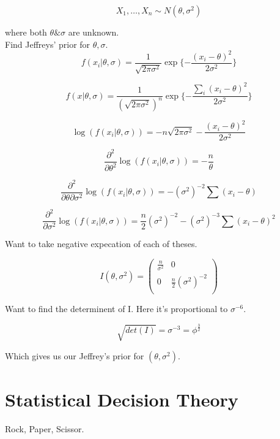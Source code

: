 \documentclass[11pt,fleqn]{book} %
\begin{document}
\begin{example}
	$$X_1, \dots, X_n \sim N(\theta, \sigma^2)$$

	where both $\theta \& \sigma$ are unknown. \\

	Find Jeffreys' prior for $\theta, \sigma$. \\

			$$f(x_i|\theta, \sigma) = \frac{1}{\sqrt{2 \pi \sigma^2}} \exp\{-\frac{(x_i - \theta)^2}{2 \sigma^2} \} $$

			$$f(x|\theta, \sigma) = \frac{1}{(\sqrt{2 \pi \sigma^2})^n} \exp\{-\frac{\sum_i(x_i - \theta)^2}{2 \sigma^2} \} $$

			$$\log(f(x_i|\theta, \sigma) )= -n \sqrt{2 \pi \sigma^2} -\frac{(x_i - \theta)^2}{2 \sigma^2}  $$

			$$\frac{\partial^2}{\partial \theta^2}\log(f(x_i|\theta, \sigma) )= -\frac{n}{\theta} $$

			$$\frac{\partial^2}{\partial \theta \partial \sigma^2}\log(f(x_i|\theta, \sigma) )= -(\sigma^2)^{-2} \sum(x_i - \theta) $$

			$$\frac{\partial^2}{\partial \sigma^2}\log(f(x_i|\theta, \sigma) )= \frac{n}{2} (\sigma^2)^{-2} - (\sigma^2)^{-3} \sum(x_i - \theta)^2 $$

			Want to take negative expecation of each of theses. 

			$$I(\theta, \sigma^2) = \begin{pmatrix}
				\frac{n}{\sigma^2} & 0 \\
				0 & \frac{n}{2} (\sigma^2)^{-2}\\
			\end{pmatrix} $$

			Want to find the determinent of I. Here it's proportional to $\sigma^{-6}$. 

					$$\sqrt{det(I)} = \sigma^{-3} = \phi^{\frac{3}{2}} $$

			Which gives us our Jeffrey's prior for $(\theta, \sigma^2).$


\end{example}


\section{Statistical Decision Theory}

	Rock, Paper, Scissor. \\
\end{document}
